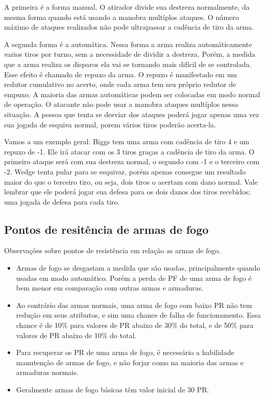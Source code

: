 A primeira é a forma manual. O atirador divide sua destreza normalmente, da mesma forma quando está usando a manobra multíplos ataques. O número máximo de ataques realizados não pode ultrapassar a cadência de tiro da arma. 

A segunda forma é a automática. Nessa forma a arma realiza automáticamente varios tiros por turno, sem a necessidade de dividir a destreza. Porém, a medida que a arma realiza os disparos ela vai se tornando mais difícil de se controlada. Esse efeito é chamado de repuxo da arma. O repuxo é manifestado em um redutor cumulativo no acerto, onde cada arma tem seu próprio redutor de empuxo. A maioria das armas automáticas podem ser colocadas em modo normal de operação. O atacante não pode usar a manobra ataques multíplos nessa situação. A pessoa que tenta se desviar dos ataques poderá jogar apenas uma vez sua jogada de esquiva normal, porem vários tiros poderão acerta-la. 

Vamos a um exemplo geral: Biggs tem uma arma com cadência de tiro 4 e um repuxo de -1. Ele irá atacar com os 3 tiros graças a cadência de tiro da arma. O primeiro ataque será com sua destreza normal, o segundo com -1 e o terceiro com -2. Wedge tenta pular para se esquivar, porém apenas consegue um resultado maior do que o terceiro tiro, ou seja, dois tiros o acertam com dano normal. Vale lembrar que ele poderá jogar sua defesa para os dois danos dos tiros recebidos; uma jogada de defesa para cada tiro.

\subsection{Pontos de resitência de armas de fogo}

Observações sobre pontos de resistência em relação as armas de fogo.
\begin{itemize}
	\item Armas de fogo se desgastam a medida que são usadas, principalmente quando usadas em modo automático. Porém a perda de PF de uma arma de fogo é bem menor em comparação com outras armas e armaduras. 

	\item Ao contrário das armas normais, uma arma de fogo com baixo PR não tem redução em seus atributos, e sim uma chance de falha de funcionamento. Essa chance é de 10\% para valores de PR abaixo de 30\% do total, e de 50\% para valores de PR abaixo de 10\% do total. 

	\item Para recuperar os PR de uma arma de fogo, é necessário a habilidade manutenção de armas de fogo, e não forjar como na maioria das armas e armaduras normais.

	\item Geralmente armas de fogo básicas têm valor inicial de 30 PR. 
\end{itemize}

